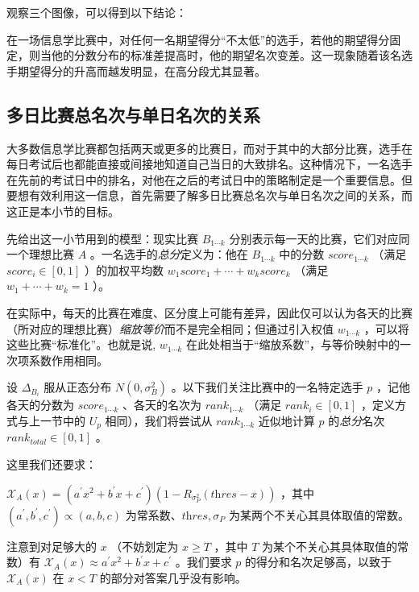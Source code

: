            观察三个图像，可以得到以下结论：

            \begin{tcolorbox}[colback=white,colframe=black,boxrule=0.5pt,arc=0pt]
                在一场信息学比赛中，对任何一名期望得分“不太低”的选手，若他的期望得分固定，则当他的分数分布的标准差提高时，他的期望名次变差。这一现象随着该名选手期望得分的升高而越发明显，在高分段尤其显著。
            \end{tcolorbox}

    \subsection{多日比赛总名次与单日名次的关系}\label{sec:relationBetweenEachDayAndTotal}

        大多数信息学比赛都包括两天或更多的比赛日，而对于其中的大部分比赛，选手在每日考试后也都能直接或间接地知道自己当日的大致排名。这种情况下，一名选手在先前的考试日中的排名，对他在之后的考试日中的策略制定是一个重要信息。但要想有效利用这一信息，首先需要了解多日比赛总名次与单日名次之间的关系，而这正是本小节的目标。

        \vspace{1.5ex}

        先给出这一小节用到的模型：现实比赛 $B_{1\cdots k}$ 分别表示每一天的比赛，它们对应同一个理想比赛 $A$ 。一名选手的\emph{总分}定义为：他在 $B_{1\cdots k}$ 中的分数 $\textit{score}_{1\cdots k}$ （满足 $\textit{score}_i\in[0,1]$ ）的加权平均数 $w_1\textit{score}_1+\cdots+w_k\textit{score}_k$ （满足 $w_1+\cdots+w_k=1$ ）。

        在实际中，每天的比赛在难度、区分度上可能有差异，因此仅可以认为各天的比赛（所对应的理想比赛）\emph{缩放等价}而不是完全相同；但通过引入权值 $w_{1\cdots k}$ ，可以将这些比赛“标准化”。也就是说, $w_{1\cdots k}$ 在此处相当于“缩放系数”，与等价映射中的一次项系数作用相同。

        设 $\Delta_{B_i}$ 服从正态分布 $N(0,\sigma_B^2)$ 。以下我们关注比赛中的一名特定选手 $p$ ，记他各天的分数为 $\textit{score}_{1\cdots k}$ 、各天的名次为 $\textit{rank}_{1\cdots k}$ （满足 $\textit{rank}_i\in [0,1]$ ，定义方式与上一节中的 $U_p$ 相同），我们将尝试从 $\textit{rank}_{1\cdots k}$ 近似地计算 $p$ 的\emph{总分}名次 $\textit{rank}_{\textit{total}}\in [0,1]$ 。
        
        这里我们还要求：
        \begin{asparaitem}
            \item $\mathcal{X}_A(x)=\left(a^\prime x^2+b^\prime x+c^\prime\right)\left(1-R_{\sigma_P^2}(\textit{thres}-x)\right)$ ，其中 $(a^\prime,b^\prime,c^\prime)\propto (a,b,c)$ 为常系数、$\textit{thres},\sigma_P$ 为某两个不关心其具体取值的常数。
            \item 注意到对足够大的 $x$ （不妨划定为 $x\geq T$ ，其中 $T$ 为某个不关心其具体取值的常数）有 $\mathcal{X}_A(x)\approx a^\prime x^2+b^\prime x+c^\prime$ 。我们要求 $p$ 的得分和名次足够高，以致于 $\mathcal{X}_A(x)$ 在 $x<T$ 的部分对答案几乎没有影响。
        \end{asparaitem}


